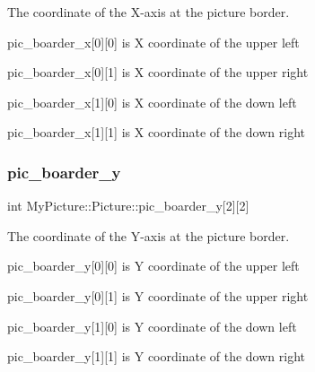 The coordinate of the X-\/axis at the picture border. 


\begin{DoxyItemize}
\item pic\+\_\+boarder\+\_\+x\mbox{[}0\mbox{]}\mbox{[}0\mbox{]} is X coordinate of the upper left
\item pic\+\_\+boarder\+\_\+x\mbox{[}0\mbox{]}\mbox{[}1\mbox{]} is X coordinate of the upper right
\item pic\+\_\+boarder\+\_\+x\mbox{[}1\mbox{]}\mbox{[}0\mbox{]} is X coordinate of the down left
\item pic\+\_\+boarder\+\_\+x\mbox{[}1\mbox{]}\mbox{[}1\mbox{]} is X coordinate of the down right 
\end{DoxyItemize}\mbox{\label{group__picture_ga062abb41cc6618e8def5f5c4a60603f3}} 
\subsubsection{\texorpdfstring{pic\+\_\+boarder\+\_\+y}{pic\_boarder\_y}}
{\footnotesize\ttfamily int My\+Picture\+::\+Picture\+::pic\+\_\+boarder\+\_\+y\mbox{[}2\mbox{]}\mbox{[}2\mbox{]}}



The coordinate of the Y-\/axis at the picture border. 


\begin{DoxyItemize}
\item pic\+\_\+boarder\+\_\+y\mbox{[}0\mbox{]}\mbox{[}0\mbox{]} is Y coordinate of the upper left
\item pic\+\_\+boarder\+\_\+y\mbox{[}0\mbox{]}\mbox{[}1\mbox{]} is Y coordinate of the upper right
\item pic\+\_\+boarder\+\_\+y\mbox{[}1\mbox{]}\mbox{[}0\mbox{]} is Y coordinate of the down left
\item pic\+\_\+boarder\+\_\+y\mbox{[}1\mbox{]}\mbox{[}1\mbox{]} is Y coordinate of the down right 
\end{DoxyItemize}